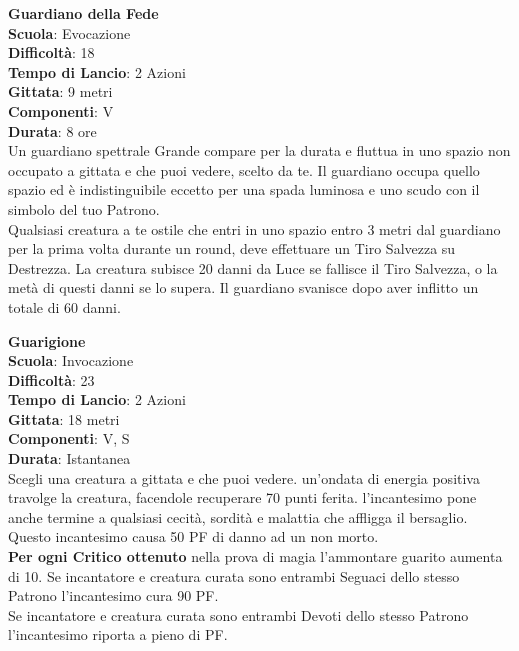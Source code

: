 \begin{multicols}{2}
\medskip\textbf{Guardiano della Fede}\\
\textbf{Scuola}: Evocazione\\
\textbf{Difficoltà}:  18\\
\textbf{Tempo di Lancio}: 2 Azioni\\
\textbf{Gittata}: 9 metri\\
\textbf{Componenti}: V\\
\textbf{Durata}: 8 ore\\
Un guardiano spettrale Grande compare per la durata e fluttua in uno spazio non occupato a gittata e che puoi vedere, scelto da te. Il guardiano occupa quello spazio ed è indistinguibile eccetto per una spada luminosa e uno scudo con il simbolo del tuo Patrono.\\
Qualsiasi creatura a te ostile che entri in uno spazio entro 3 metri dal guardiano per la prima volta durante un round, deve effettuare un Tiro Salvezza su Destrezza. La creatura subisce 20 danni da Luce se fallisce il Tiro Salvezza, o la metà di questi danni se lo supera. Il guardiano svanisce dopo aver inflitto un totale di 60 danni.

\medskip\textbf{Guarigione}\\
\textbf{Scuola}: Invocazione\\
\textbf{Difficoltà}:  23\\
\textbf{Tempo di Lancio}: 2 Azioni\\
\textbf{Gittata}: 18 metri\\
\textbf{Componenti}: V, S\\
\textbf{Durata}: Istantanea\\
Scegli una creatura a gittata e che puoi vedere. un'ondata di energia positiva travolge la creatura, facendole recuperare 70 punti ferita. l'incantesimo pone anche termine a qualsiasi cecità, sordità e malattia che affligga il bersaglio. Questo incantesimo causa 50 PF di danno ad un non morto.\\
\textbf{Per ogni Critico ottenuto} nella prova di magia l’ammontare guarito aumenta di 10.
Se incantatore e creatura curata sono entrambi Seguaci dello stesso Patrono l'incantesimo cura 90 PF.\\
Se incantatore e creatura curata sono entrambi Devoti dello stesso Patrono l'incantesimo riporta a pieno di PF.\\


\end{multicols}
